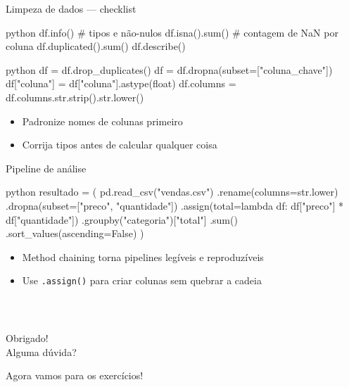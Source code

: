 \documentclass[xcolor=dvipsnames,t,aspectratio=169]{beamer}
\newcommand{\highlight}[1]{{\color{nes_dark_orange} #1}}
\begin{document}
\begin{frame}[c, fragile]{Limpeza de dados — checklist}

\begin{code}{python}
df.info()           # tipos e não-nulos
df.isna().sum()     # contagem de NaN por coluna
df.duplicated().sum()
df.describe()
\end{code}

\begin{code}[Limpeza]{python}
df = df.drop_duplicates()
df = df.dropna(subset=["coluna_chave"])
df["coluna"] = df["coluna"].astype(float)
df.columns = df.columns.str.strip().str.lower()
\end{code}

\begin{itemize}
    \item Padronize nomes de colunas \highlight{primeiro}
    \item Corrija tipos \highlight{antes} de calcular qualquer coisa
\end{itemize}

\end{frame}


\begin{frame}[c, fragile]{Pipeline de análise}

\begin{code}{python}
resultado = (
    pd.read_csv("vendas.csv")
      .rename(columns=str.lower)
      .dropna(subset=["preco", "quantidade"])
      .assign(total=lambda df: df["preco"] * df["quantidade"])
      .groupby("categoria")["total"]
      .sum()
      .sort_values(ascending=False)
)
\end{code}

\begin{itemize}
    \item \highlight{Method chaining} torna pipelines legíveis e reproduzíveis
    \item Use \texttt{.assign()} para criar colunas sem quebrar a cadeia
\end{itemize}

\end{frame}


\begin{frame}
    \frametitle{~}
        \vfill
        \begin{center}
            {\Huge Obrigado!}\vspace{1.5em}\\
            {\Large \highlight{Alguma dúvida?}}\\
        \end{center}
        \vfill
        \begin{center}
            {\small Agora vamos para os exercícios!}
        \end{center}
\end{frame}
\end{document}
